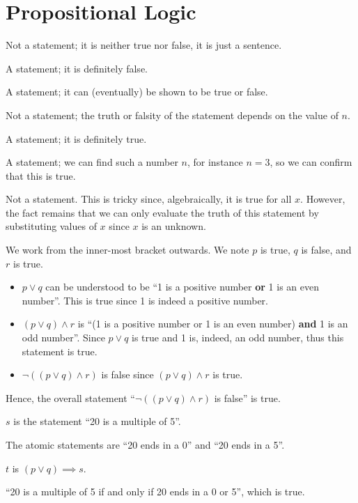 \section{Propositional Logic}
\begin{questions}
    \item \begin{partquestions}{\alph*}
        \item Not a statement; it is neither true nor false, it is just a sentence.
        \item A statement; it is definitely false.
        \item A statement; it can (eventually) be shown to be true or false.
        \item Not a statement; the truth or falsity of the statement depends on the value of $n$.
        \item A statement; it is definitely true.
        \item A statement; we can find such a number $n$, for instance $n = 3$, so we can confirm that this is true.
        \item Not a statement. This is tricky since, algebraically, it is true for all $x$. However, the fact remains that we can only evaluate the truth of this statement by substituting values of $x$ since $x$ is an unknown.
    \end{partquestions}

    \item We work from the inner-most bracket outwards. We note $p$ is true, $q$ is false, and $r$ is true.
    \begin{itemize}
        \item $p \lor q$ can be understood to be ``1 is a positive number \textbf{or} 1 is an even number''. This is true since 1 is indeed a positive number.
        \item $(p \lor q) \land r$ is ``(1 is a positive number or 1 is an even number) \textbf{and} 1 is an odd number''. Since $p \lor q$ is true and 1 is, indeed, an odd number, thus this statement is true.
        \item $\lnot((p \lor q) \land r)$ is false since $(p \lor q) \land r$ is true.
    \end{itemize}
    Hence, the overall statement ``$\lnot((p \lor q) \land r)$ is false'' is true.

    \item \begin{partquestions}{\roman*}
        \item $s$ is the statement ``20 is a multiple of 5''.
        \item The atomic statements are ``20 ends in a 0'' and ``20 ends in a 5''.
        \item $t$ is $(p \lor q) \implies s$.
        \item ``20 is a multiple of 5 if and only if 20 ends in a 0 or 5'', which is true.
    \end{partquestions}


\end{questions}
